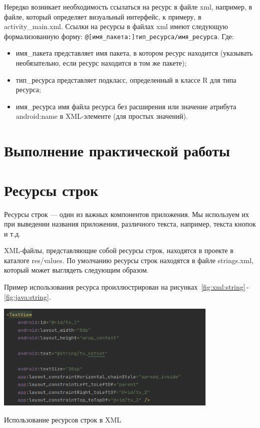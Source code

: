 Нередко возникает необходимость ссылаться на ресурс в файле xml,
например, в файле, который определяет визуальный интерфейс, к примеру, в
activity\_main.xml. Ссылки на ресурсы в файлах xml имеют следующую
формализованную форму: \verb|@[имя_пакета:]тип_ресурса/имя_ресурса|. Где:
\begin{itemize}
	\item имя\_пакета представляет имя пакета, в котором ресурс находится
		(указывать необязательно, если ресурс находится в том же пакете);
	\item тип\_ресурса представляет подкласс, определенный в классе R для
		типа ресурса;
	\item имя\_ресурса имя файла ресурса без расширения или значение
		атрибута android:name в XML-элементе (для простых значений).
\end{itemize}

\clearpage

\section*{\LARGE{Выполнение практической работы}}

\section{Ресурсы строк}
Ресурсы строк --- один из важных компонентов приложения. Мы используем
их при выведении названия приложения, различного текста, например, текста
кнопок и т.д.\par
XML-файлы, представляющие собой ресурсы строк, находятся в проекте в
каталоге res/values. По умолчанию ресурсы строк находятся в файле strings.xml,
который может выглядеть следующим образом.\par
Пример использования ресурса проиллюстрирован на
рисунках~\ref{fig:xml:string}\,-\,\ref{fig:java:string}.

\begin{image}
	\includegraphics[width=0.8\textwidth]{Screenshot from 2023-03-28 15-20-22.png}
	\caption{Использование ресурсов строк в XML}
	\label{fig:xml:string}
\end{image}

